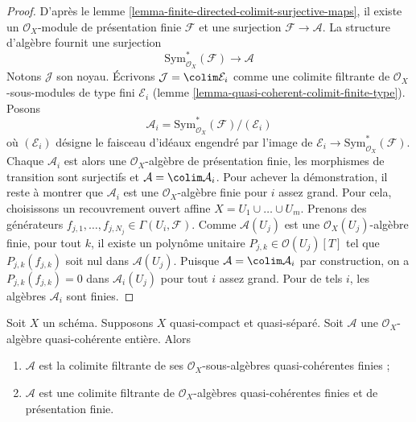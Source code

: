 \begin{proof}
D'après le lemme \ref{lemma-finite-directed-colimit-surjective-maps},
il existe un $\mathcal{O}_X$-module de présentation finie
$\mathcal{F}$ et une surjection $\mathcal{F} \to \mathcal{A}$.
La structure d'algèbre fournit une surjection
$$
\text{Sym}^*_{\mathcal{O}_X}(\mathcal{F}) \longrightarrow \mathcal{A}
$$
Notons $\mathcal{J}$ son noyau. Écrivons $\mathcal{J} = \colim \mathcal{E}_i$
comme une colimite filtrante de $\mathcal{O}_X$-sous-modules de type fini
$\mathcal{E}_i$ (lemme \ref{lemma-quasi-coherent-colimit-finite-type}). Posons
$$
\mathcal{A}_i = \text{Sym}^*_{\mathcal{O}_X}(\mathcal{F})/(\mathcal{E}_i)
$$
où $(\mathcal{E}_i)$ désigne le faisceau d'idéaux engendré
par l'image de $\mathcal{E}_i \to \text{Sym}^*_{\mathcal{O}_X}(\mathcal{F})$.
Chaque $\mathcal{A}_i$ est alors une $\mathcal{O}_X$-algèbre de
présentation finie, les morphismes de transition sont
surjectifs et $\mathcal{A} = \colim \mathcal{A}_i$. Pour achever la démonstration, il
reste à montrer que $\mathcal{A}_i$ est une $\mathcal{O}_X$-algèbre finie
pour $i$ assez grand. Pour cela, choisissons un recouvrement
ouvert affine $X = U_1 \cup \ldots \cup U_m$. Prenons des générateurs
$f_{j, 1}, \ldots, f_{j, N_j} \in \Gamma(U_i, \mathcal{F})$.
Comme $\mathcal{A}(U_j)$ est une $\mathcal{O}_X(U_j)$-algèbre
finie, pour tout $k$, il existe un polynôme unitaire
$P_{j, k} \in \mathcal{O}(U_j)[T]$ tel que $P_{j, k}(f_{j, k})$
soit nul dans $\mathcal{A}(U_j)$. Puisque
$\mathcal{A} = \colim \mathcal{A}_i$ par construction,
on a $P_{j, k}(f_{j, k}) = 0$ dans $\mathcal{A}_i(U_j)$
pour tout $i$ assez grand. Pour de tels $i$, les algèbres
$\mathcal{A}_i$ sont finies.
\end{proof}

\begin{lemma}
\label{lemma-integral-algebra-directed-colimit-finite}
Soit $X$ un schéma. Supposons $X$ quasi-compact et quasi-séparé.
Soit $\mathcal{A}$ une $\mathcal{O}_X$-algèbre quasi-cohérente
entière. Alors
\begin{enumerate}
\item $\mathcal{A}$ est la colimite
filtrante de ses $\mathcal{O}_X$-sous-algèbres quasi-cohérentes finies ;
\item $\mathcal{A}$ est une colimite
filtrante de $\mathcal{O}_X$-algèbres quasi-cohérentes finies et de présentation finie.
\end{enumerate}
\end{lemma}


